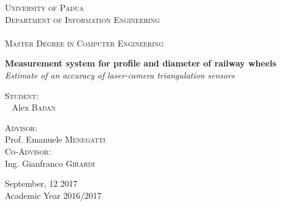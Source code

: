\addtolength{\voffset}{3cm}

\begin{center}
  \textsc{
    \huge{University of Padua} \\
    \large{Department of Information Engineering} \\~\\
    \Large{Master Degree in Computer Engineering} \\
  }
  \vspace*{\fill}

  \huge{\textbf{Measurement system for profile and diameter of railway wheels}}\\[4mm]
  \Large{\textit{Estimate of an accuracy of laser-camera triangulation sensors}}\\[\baselineskip]
  \vspace*{\fill}

  \begin{minipage}[t]{0.49\textwidth}
    \flushleft
    \textsc{\large{Student:}} \\~ \large{Alex \textsc{Badan}} \\
  \end{minipage}
  \hfill
  \begin{minipage}[t]{0.49\textwidth}
    \flushright
    \textsc{\large{Advisor:}}    \\ \large{Prof. Emanuele \textsc{Menegatti}~~}~ \\
    \textsc{\large{Co-Advisor:}} \\ \large{Ing. Gianfranco \textsc{Girardi}~~}~ \\
  \end{minipage}
  
  \vspace*{\fill}
  \normalsize{September, 12 2017 \\ Academic Year 2016/2017}
\end{center}

